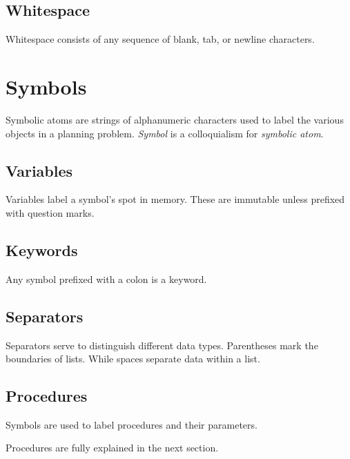 \documentclass[
a4paper, %
11pt, %
onecolumn, %
openany, %
]{memoir}
\begin{document}
{\section{Whitespace}
Whitespace consists of any sequence of blank, tab, or newline characters.


\chapter{Symbols}
Symbolic atoms are strings of alphanumeric characters used to label the various objects in a planning problem. \textit{Symbol} is a colloquialism for \textit{symbolic atom}.

\section{Variables}
Variables label a symbol's spot in memory. These are immutable unless prefixed with question marks.
\begin{bnf*}
\end{bnf*}

\section{Keywords}
Any symbol prefixed with a colon is a keyword. 
\begin{bnf*}
\end{bnf*}

\section{Separators}
Separators serve to distinguish different data types. Parentheses mark the boundaries of lists. While spaces separate data within a list.
\begin{bnf*}
\end{bnf*}


\section{Procedures}
Symbols are used to label procedures and their parameters. 
\begin{bnf*}
\end{bnf*}
Procedures are fully explained in the next section.
}
\end{document}
